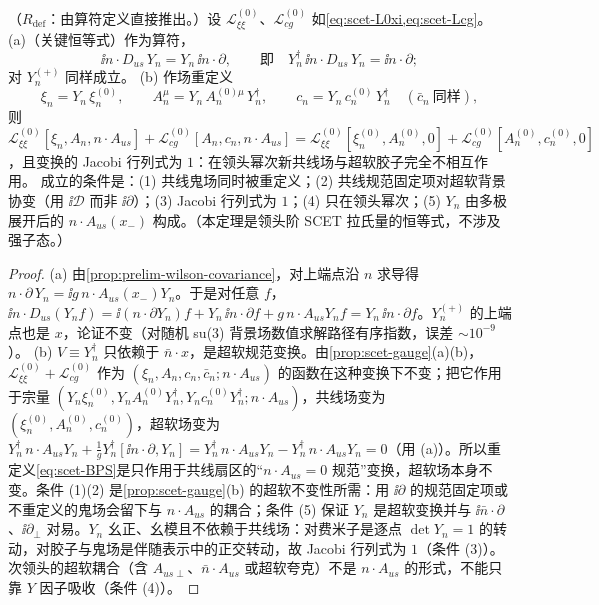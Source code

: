 \begin{theorem}\label{thm:scet-decoupling}
（$R_{\mathrm{def}}$：由算符定义直接推出。）设 $\mathcal L^{(0)}_{\xi\xi}$、$\mathcal L^{(0)}_{cg}$ 如\cref{eq:scet-L0xi,eq:scet-Lcg}。
(a)（关键恒等式）作为算符，
\begin{equation}\label{eq:scet-key}
\ii n\cdot D_{us}\,Y_n=Y_n\,\ii n\cdot\partial,\qquad\text{即}\quad Y_n^\dagger\,\ii n\cdot D_{us}\,Y_n=\ii n\cdot\partial ;
\end{equation}
对 $Y_n^{(+)}$ 同样成立。
(b) 作场重定义
\begin{equation}\label{eq:scet-BPS}
\xi_n=Y_n\,\xi_n^{(0)},\qquad A_n^\mu=Y_n\,A_n^{(0)\mu}\,Y_n^\dagger,\qquad c_n=Y_n\,c_n^{(0)}\,Y_n^\dagger\quad(\bar c_n\ \text{同样}),
\end{equation}
则 $\mathcal L^{(0)}_{\xi\xi}[\xi_n,A_n,n\cdot A_{us}]+\mathcal L^{(0)}_{cg}[A_n,c_n,n\cdot A_{us}]=\mathcal L^{(0)}_{\xi\xi}[\xi^{(0)}_n,A^{(0)}_n,0]+\mathcal L^{(0)}_{cg}[A^{(0)}_n,c^{(0)}_n,0]$，且变换的 Jacobi 行列式为 $1$：在领头幂次新共线场与超软胶子完全不相互作用。
成立的条件是：(1) 共线鬼场同时被重定义；(2) 共线规范固定项对超软背景协变（用 $\ii\mathcal D$ 而非 $\ii\partial$）；(3) Jacobi 行列式为 $1$；(4) 只在领头幂次；(5) $Y_n$ 由多极展开后的 $n\cdot A_{us}(x_-)$ 构成。（本定理是领头阶 SCET 拉氏量的恒等式，不涉及强子态。）
\end{theorem}

\begin{proof}
(a) 由\cref{prop:prelim-wilson-covariance}，对上端点沿 $n$ 求导得 $n\cdot\partial\,Y_n=\ii g\,n\cdot A_{us}(x_-)Y_n$。于是对任意 $f$，
$\ii n\cdot D_{us}(Y_nf)=\ii(n\cdot\partial Y_n)f+Y_n\,\ii n\cdot\partial f+g\,n\cdot A_{us}Y_nf=Y_n\,\ii n\cdot\partial f$。$Y_n^{(+)}$ 的上端点也是 $x$，论证不变（对随机 su(3) 背景场数值求解路径有序指数，误差 $\sim10^{-9}$）。%
(b) $V\equiv Y_n^\dagger$ 只依赖于 $\bar n\cdot x$，是超软规范变换。由\cref{prop:scet-gauge}(a)(b)，$\mathcal L^{(0)}_{\xi\xi}+\mathcal L^{(0)}_{cg}$ 作为 $(\xi_n,A_n,c_n,\bar c_n;n\cdot A_{us})$ 的函数在这种变换下不变；把它作用于宗量 $(Y_n\xi^{(0)}_n,Y_nA^{(0)}_nY_n^\dagger,Y_nc^{(0)}_nY_n^\dagger;n\cdot A_{us})$，共线场变为 $(\xi^{(0)}_n,A^{(0)}_n,c^{(0)}_n)$，超软场变为
$Y_n^\dagger\,n\cdot A_{us}Y_n+\frac1gY_n^\dagger[\ii n\cdot\partial,Y_n]=Y_n^\dagger\,n\cdot A_{us}Y_n-Y_n^\dagger\,n\cdot A_{us}Y_n=0$（用 (a)）。所以重定义\cref{eq:scet-BPS}是只作用于共线扇区的“$n\cdot A_{us}=0$ 规范”变换，超软场本身不变。条件 (1)(2) 是\cref{prop:scet-gauge}(b) 的超软不变性所需：用 $\ii\partial$ 的规范固定项或不重定义的鬼场会留下与 $n\cdot A_{us}$ 的耦合；条件 (5) 保证 $Y_n$ 是超软变换并与 $\ii\bar n\cdot\partial$、$\ii\partial_\perp$ 对易。$Y_n$ 幺正、幺模且不依赖于共线场：对费米子是逐点 $\det Y_n=1$ 的转动，对胶子与鬼场是伴随表示中的正交转动，故 Jacobi 行列式为 $1$（条件 (3)）。次领头的超软耦合（含 $A_{us\perp}$、$\bar n\cdot A_{us}$ 或超软夸克）不是 $n\cdot A_{us}$ 的形式，不能只靠 $Y$ 因子吸收\cite{BauerPirjolStewart2002}（条件 (4)）。
\end{proof}

